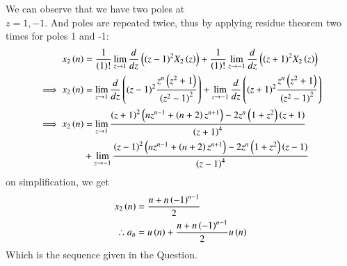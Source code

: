 \documentclass[journal,12pt,twocolumn]{IEEEtran}
\theoremstyle{remark}
\begin{document}
\newpage

We can observe that we have two poles at \\$ z= 1,-1$. And poles are repeated twice, thus by applying residue theorem two times for poles 1 and -1:
\begin{align}
    x_2\left(n\right)&=\frac{1}{\left(1\right)!}\lim\limits_{z\to 1}\frac{d}{dz}\left({(z-1)}^{2}X_2\left(z\right)\right) + \frac{1}{\left(1\right)!}\lim\limits_{z\to -1}\frac{d}{dz}\left({(z+1)}^{2}X_2\left(z\right)\right) \\
\implies    x_2\left(n\right) &=\lim\limits_{z\to 1}\frac{d}{dz}\left({(z-1)}^{2}\frac{z^n\left(z^2+1\right)}{{(z^2-1)}^2}\right)+ \lim\limits_{z\to -1}\frac{d}{dz}\left({(z+1)}^{2}\frac{z^n\left(z^2+1\right)}{{(z^2-1)}^2}\right)   \\
\notag \implies x_2\left(n\right) &= \lim\limits_{z\to 1}\frac{\left(z+1\right)^2\left(nz^{n-1}+ \left(n+2\right)z^{n+1}\right)-2z^n\left(1+z^2\right)\left(z+1\right)}{\left(z+1\right)^4}\\
    &+ \lim\limits_{z\to -1}\frac{\left(z-1\right)^2\left(nz^{n-1}+ \left(n+2\right)z^{n+1}\right)-2z^n\left(1+z^2\right)\left(z-1\right)}{\left(z-1\right)^4}
\end{align}
on simplification, we get
\begin{align}
x_2\left(n\right) &= \frac{n+n\left(-1\right)^{n-1}}{2}\\
\therefore a_n &= u\left(n\right) + \frac{n+n\left(-1\right)^{n-1}}{2} u\left(n\right)
\end{align}
Which is the sequence given in the Question.
\end{document}
